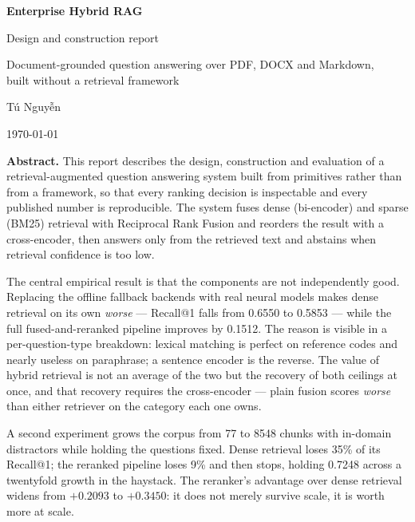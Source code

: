 \documentclass[11pt,a4paper]{article}
\newcommand{\ecircumflextilde}{\~{\^e}}
\begin{document}
\begin{titlepage}
\centering
\vspace*{2.5cm}

{\Huge\bfseries\color{ink} Enterprise Hybrid RAG\par}
\vspace{0.8cm}
{\Large\color{ink} Design and construction report\par}
\vspace{0.4cm}
{\large\color{ink} Document-grounded question answering over PDF, DOCX and Markdown,\\
built without a retrieval framework\par}

\vspace{1.1cm}
{\color{ink}\normalsize T\'u Nguy\ecircumflextilde n\par}
\vspace{0.15cm}
{\color{ink}\small \today\par}

\vspace{1.4cm}
\begin{minipage}{0.86\textwidth}
\color{ink}\normalsize
\textbf{Abstract.} This report describes the design, construction and evaluation
of a retrieval-augmented question answering system built from primitives rather
than from a framework, so that every ranking decision is inspectable and every
published number is reproducible. The system fuses dense (bi-encoder) and sparse
(BM25) retrieval with Reciprocal Rank Fusion and reorders the result with a
cross-encoder, then answers only from the retrieved text and abstains when
retrieval confidence is too low.

The central empirical result is that the components are not independently good.
Replacing the offline fallback backends with real neural models makes dense
retrieval on its own \emph{worse} --- Recall@1 falls from 0.6550 to 0.5853 ---
while the full fused-and-reranked pipeline improves by 0.1512. The reason is
visible in a per-question-type breakdown: lexical matching is perfect on
reference codes and nearly useless on paraphrase; a sentence encoder is the
reverse. The value of hybrid retrieval is not an average of the two but the
recovery of both ceilings at once, and that recovery requires the cross-encoder
--- plain fusion scores \emph{worse} than either retriever on the category each
one owns.

A second experiment grows the corpus from 77 to 8548 chunks with in-domain
distractors while holding the questions fixed. Dense retrieval loses 35\% of its
Recall@1; the reranked pipeline loses 9\% and then stops, holding 0.7248 across a
twentyfold growth in the haystack. The reranker's advantage over dense retrieval
widens from $+0.2093$ to $+0.3450$: it does not merely survive scale, it is worth
more at scale.


\end{minipage}
\end{titlepage}
\end{document}
